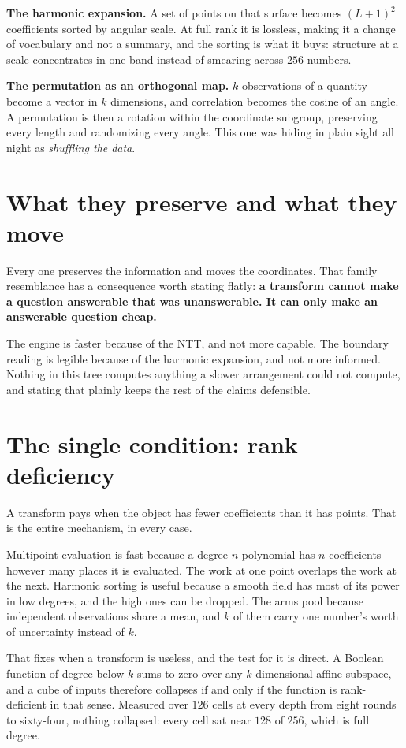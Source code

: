 \textbf{The harmonic expansion.} A set of points on that surface becomes \((L+1)^2\) coefficients sorted by angular scale. At full rank it is lossless, making it a change of vocabulary and not a summary, and the sorting is what it buys: structure at a scale concentrates in one band instead of smearing across \(256\) numbers.

\textbf{The permutation as an orthogonal map.} \(k\) observations of a quantity become a vector in \(k\) dimensions, and correlation becomes the cosine of an angle. A permutation is then a rotation within the coordinate subgroup, preserving every length and randomizing every angle. This one was hiding in plain sight all night as \emph{shuffling the data}.

\section{What they preserve and what they move}

Every one preserves the information and moves the coordinates. That family resemblance has a consequence worth stating flatly: \textbf{a transform cannot make a question answerable that was unanswerable. It can only make an answerable question cheap.}

The engine is faster because of the NTT, and not more capable. The boundary reading is legible because of the harmonic expansion, and not more informed. Nothing in this tree computes anything a slower arrangement could not compute, and stating that plainly keeps the rest of the claims defensible.

\section{The single condition: rank deficiency}

A transform pays when the object has fewer coefficients than it has points. That is the entire mechanism, in every case.

Multipoint evaluation is fast because a degree-\(n\) polynomial has \(n\) coefficients however many places it is evaluated. The work at one point overlaps the work at the next. Harmonic sorting is useful because a smooth field has most of its power in low degrees, and the high ones can be dropped. The arms pool because independent observations share a mean, and \(k\) of them carry one number's worth of uncertainty instead of \(k\).

That fixes when a transform is useless, and the test for it is direct. A Boolean function of degree below \(k\) sums to zero over any \(k\)-dimensional affine subspace, and a cube of inputs therefore collapses if and only if the function is rank-deficient in that sense. Measured over \(126\) cells at every depth from eight rounds to sixty-four, nothing collapsed: every cell sat near \(128\) of \(256\), which is full degree.

